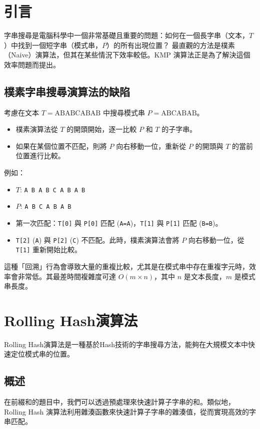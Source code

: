 \section{引言}
字串搜尋是電腦科學中一個非常基礎且重要的問題：如何在一個長字串（文本，$T$）中找到一個短字串（模式串，$P$）的所有出現位置？
最直觀的方法是樸素（Naive）演算法，但其在某些情況下效率較低。KMP 演算法正是為了解決這個效率問題而提出。

\subsection{樸素字串搜尋演算法的缺陷}
考慮在文本 $T = \text{ABABCABAB}$ 中搜尋模式串 $P = \text{ABCABAB}$。
\begin{itemize}
    \item 樸素演算法從 $T$ 的開頭開始，逐一比較 $P$ 和 $T$ 的子字串。
    \item 如果在某個位置不匹配，則將 $P$ 向右移動一位，重新從 $P$ 的開頭與 $T$ 的當前位置進行比較。
\end{itemize}

例如：
\begin{itemize}
    \item $T$: \verb|A B A B C A B A B|
    \item $P$: \verb|A B C A B A B|
    \item 第一次匹配：\verb|T[0]| 與 \verb|P[0]| 匹配 (\verb|A=A|)，\verb|T[1]| 與 \verb|P[1]| 匹配 (\verb|B=B|)。
    \item \verb|T[2]| (\verb|A|) 與 \verb|P[2]| (\verb|C|) 不匹配。此時，樸素演算法會將 $P$ 向右移動一位，從 \verb|T[1]| 重新開始比較。
\end{itemize}
這種「回溯」行為會導致大量的重複比較，尤其是在模式串中存在重複字元時，效率會非常低。其最差時間複雜度可達 $O(m \times n)$，其中 $n$ 是文本長度，$m$ 是模式串長度。

\section{Rolling Hash演算法}

Rolling Hash演算法是一種基於Hash技術的字串搜尋方法，能夠在大規模文本中快速定位模式串的位置。

\subsection{概述}

在前綴和的題目中，我們可以透過預處理來快速計算子字串的和。類似地，Rolling Hash 演算法利用雜湊函數來快速計算子字串的雜湊值，從而實現高效的字串匹配。

